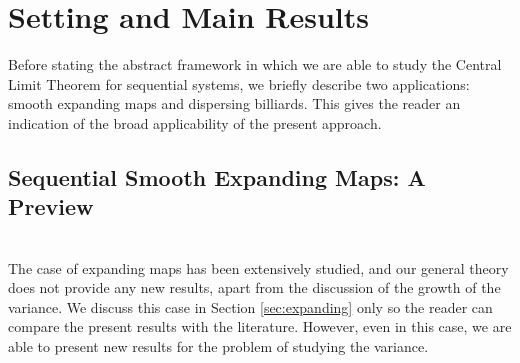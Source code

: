 \documentclass{amsart}
\numberwithin{equation}{section}
\begin{document}

\section{Setting and Main Results}
\label{sec:setting}


Before stating the abstract framework in which we are able to study the Central Limit Theorem for sequential systems, we briefly describe two applications:
smooth expanding maps and dispersing billiards.  This gives the reader an indication of the broad applicability of the present
approach.


\subsection{Sequential Smooth Expanding Maps: A Preview}\label{sec:expanding_p}\ \\
\label{sec:exp preview}
The case of expanding maps has been extensively studied, and our general theory does not provide any new results, apart from the discussion of the growth of the variance. We discuss this case in Section \ref{sec:expanding} only so the reader can compare the present results with the literature.  However, even in this case, we are able to present new results for the problem of studying the variance.
\end{document}

